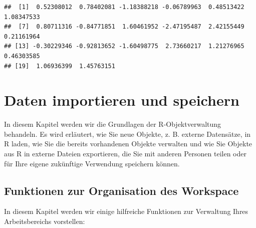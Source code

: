 \documentclass[
]{book}
\begin{document}
\begin{verbatim}
##  [1]  0.52308012  0.78402081 -1.18388218 -0.06789963  0.48513422  1.08347533
##  [7]  0.80711316 -0.84771851  1.60461952 -2.47195487  2.42155449  0.21161964
## [13] -0.30229346 -0.92813652 -1.60498775  2.73660217  1.21276965  0.46303585
## [19]  1.06936399  1.45763151
\end{verbatim}

\hypertarget{daten-importieren-und-speichern}{%
\chapter{Daten importieren und speichern}\label{daten-importieren-und-speichern}}

In diesem Kapitel werden wir die Grundlagen der R-Objektverwaltung behandeln. Es wird erläutert, wie Sie neue Objekte, z. B. externe Datensätze, in R laden, wie Sie die bereits vorhandenen Objekte verwalten und wie Sie Objekte aus R in externe Dateien exportieren, die Sie mit anderen Personen teilen oder für Ihre eigene zukünftige Verwendung speichern können.

\hypertarget{funktionen-zur-organisation-des-workspace}{%
\section{Funktionen zur Organisation des Workspace}\label{funktionen-zur-organisation-des-workspace}}

In diesem Kapitel werden wir einige hilfreiche Funktionen zur Verwaltung Ihres Arbeitsbereichs vorstellen:
\end{document}
